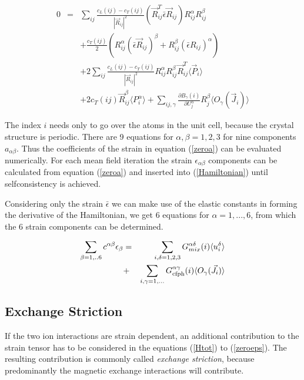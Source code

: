 \begin{eqnarray}\label{zeroa}
0&=& \sum_{ij} \frac{c_L(ij)-c_T(ij)}{|\vec R_{ij}|^2} 
(\vec R_{ij}^T\bar \epsilon \vec R_{ij})R_{ij}^{\alpha}R_{ij}^{\beta}   \\
      && + \frac{c_T(ij)}{2} (R_{ij}^{\alpha} (\bar \epsilon \vec R_{ij})^{\beta}+R_{ij}^{\beta} (\bar \epsilon R_{ij})^{\alpha}) \nonumber \\
&& +2\sum_{ij} \frac{c_L(ij)-c_T(ij)}{|\vec R_{ij}|^2} 
R_{ij}^{\alpha}R_{ij}^{\beta} \vec R_{ij}^T \langle \vec P_{i} \rangle  \nonumber \\
      && +2 c_T(ij) \vec  R_{ij}^{\beta} \langle P_{i}^{\alpha} \rangle
+ \sum_{ij,\gamma}\frac{\partial B_{\gamma}(i)}{\partial U_j^{\alpha}}   R_j^{\beta}  \langle O_{\gamma}(\vec J_i) \rangle \nonumber
 \end{eqnarray}

The index $i$ needs only to go over the atoms in the unit cell, because the crystal structure
is periodic. There are 9 equations for $\alpha,\beta=1,2,3$ for nine components
$a_{\alpha\beta}$. Thus the coefficients of the strain  in  equation (\ref{zeroa})
can be evaluated numerically. For each mean field iteration the strain $\epsilon_{\alpha\beta}$ components
can be calculated from equation (\ref{zeroa}) and inserted into (\ref{Hamiltonian}) until
selfconsistency is achieved.

Considering only the strain $\bar \epsilon$ we can make use of the elastic constants
in forming the derivative of the Hamiltonian, 
we get 6 equations for $\alpha=1,...,6$, from which the 6 strain components can be determined.


\begin{eqnarray}\label{zeroeps}
\sum_{\beta=1,..6}  c^{\alpha\beta} \epsilon_{\beta} &=&
 \sum_{i,\delta=1,2,3}  G_{mix}^{\alpha\delta}(i)\langle u_{i}^{\delta} \rangle  \\
 &+& \sum_{i,\gamma=1,...} G_{\rm cfph}^{\alpha\gamma}(i) \langle O_{\gamma}(\vec J_i) \rangle \nonumber
\end{eqnarray}




\subsection{Exchange Striction}

If the two ion interactions are strain dependent, an additional contribution to the
strain tensor has to be considered in the equations (\ref{Htot}) to (\ref{zeroeps}).
The resulting contribution is commonly called {\em exchange striction}, because
predominantly the magnetic exchange interactions will contribute.

